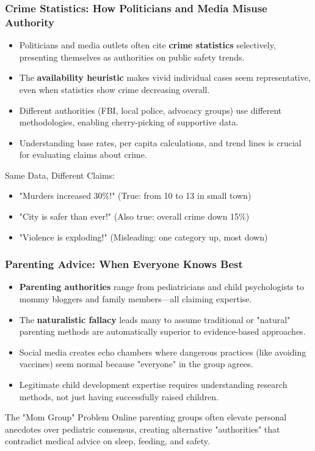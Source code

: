 \documentclass{beamer}
\begin{document}
	\begin{frame}
		\frametitle{Crime Statistics: How Politicians and Media Misuse Authority}
		\begin{itemize}
			\item Politicians and media outlets often cite \textbf{crime statistics} selectively, presenting themselves as authorities on public safety trends.
			\item The \textbf{availability heuristic} makes vivid individual cases seem representative, even when statistics show crime decreasing overall.
			\item Different authorities (FBI, local police, advocacy groups) use different methodologies, enabling cherry-picking of supportive data.
			\item Understanding base rates, per capita calculations, and trend lines is crucial for evaluating claims about crime.
		\end{itemize}
		
		\begin{example}
			Same Data, Different Claims:
			\begin{itemize}
				\item "Murders increased 30\%!" (True: from 10 to 13 in small town)
				\item "City is safer than ever!" (Also true: overall crime down 15\%)
				\item "Violence is exploding!" (Misleading: one category up, most down)
			\end{itemize}
		\end{example}
	\end{frame}
	
	
	\begin{frame}
		\frametitle{Parenting Advice: When Everyone Knows Best}
		\begin{itemize}
			\item \textbf{Parenting authorities} range from pediatricians and child psychologists to mommy bloggers and family members—all claiming expertise.
			\item The \textbf{naturalistic fallacy} leads many to assume traditional or "natural" parenting methods are automatically superior to evidence-based approaches.
			\item Social media creates echo chambers where dangerous practices (like avoiding vaccines) seem normal because "everyone" in the group agrees.
			\item Legitimate child development expertise requires understanding research methods, not just having successfully raised children.
		\end{itemize}
		
		\begin{alertblock}{The "Mom Group" Problem}
			Online parenting groups often elevate personal anecdotes over pediatric consensus, creating alternative "authorities" that contradict medical advice on sleep, feeding, and safety.
		\end{alertblock}
	\end{frame}
	
\end{document}
